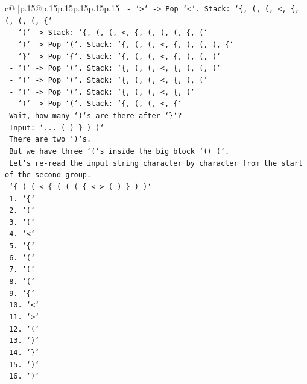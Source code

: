 \documentclass{article}
\begin{document}
{\begin{supertabular}{c@{$\;$}|p{.15\linewidth}@{}p{.15\linewidth}p{.15\linewidth}p{.15\linewidth}p{.15\linewidth}p{.15\linewidth}}
{{{\texttt{      {-} `>` {-}> Pop `<`. Stack: `\{, (, (, <, \{, (, (, (, \{`} \\
\texttt{      {-} `(` {-}> Stack: `\{, (, (, <, \{, (, (, (, \{, (`} \\
\texttt{      {-} `)` {-}> Pop `(`. Stack: `\{, (, (, <, \{, (, (, (, \{`} \\
\texttt{      {-} `\}` {-}> Pop `\{`. Stack: `\{, (, (, <, \{, (, (, (`} \\
\texttt{      {-} `)` {-}> Pop `(`. Stack: `\{, (, (, <, \{, (, (, (`} \\
\texttt{      {-} `)` {-}> Pop `(`. Stack: `\{, (, (, <, \{, (, (`} \\
\texttt{      {-} `)` {-}> Pop `(`. Stack: `\{, (, (, <, \{, (`} \\
\texttt{      {-} `)` {-}> Pop `(`. Stack: `\{, (, (, <, \{`} \\
\texttt{      Wait, how many `)`s are there after `\}`?} \\
\texttt{      Input: `... ( ) \} ) )`} \\
\texttt{      There are two `)`s.} \\
\texttt{      But we have three `(`s inside the big block `(( (`.} \\
\texttt{      Let's re{-}read the input string character by character from the start of the second group.} \\
\texttt{      `\{ ( ( < \{ ( ( ( \{ < > ( ) \} ) )`} \\
\texttt{      1. `\{`} \\
\texttt{      2. `(`} \\
\texttt{      3. `(`} \\
\texttt{      4. `<`} \\
\texttt{      5. `\{`} \\
\texttt{      6. `(`} \\
\texttt{      7. `(`} \\
\texttt{      8. `(`} \\
\texttt{      9. `\{`} \\
\texttt{      10. `<`} \\
\texttt{      11. `>`} \\
\texttt{      12. `(`} \\
\texttt{      13. `)`} \\
\texttt{      14. `\}`} \\
\texttt{      15. `)`} \\
\texttt{      16. `)`} \\
\\ 
}}}
\end{supertabular}}
\end{document}

